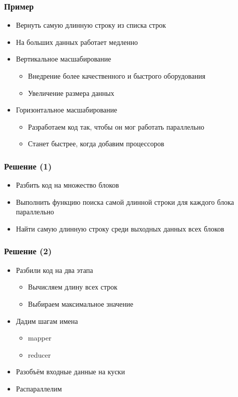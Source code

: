 \documentclass[xetex,mathserif,serif]{beamer}
\begin{document}
\begin{frame}

	\frametitle{Пример}

	\begin{itemize}
		\item Вернуть самую длинную строку из списка строк
		\item На больших данных работает медленно
		\item Вертикальное масшабирование
		      \begin{itemize}
			      \item Внедрение более качественного и быстрого оборудования
			      \item Увеличение размера данных
		      \end{itemize}
		\item Горизонтальное масшабирование
		      \begin{itemize}
			      \item Разработаем код так, чтобы он мог работать параллельно
			      \item Станет быстрее, когда добавим процессоров
		      \end{itemize}
	\end{itemize}

\end{frame}

\begin{frame}

	\frametitle{Решение (1)}

	\begin{itemize}
		\item Разбить код на множество блоков
		\item Выполнить функцию поиска самой длинной строки для каждого блока параллельно
		\item Найти самую длинную строку среди выходных данных всех блоков
	\end{itemize}

\end{frame}

\begin{frame}

	\frametitle{Решение (2)}

	\begin{itemize}
		\item Разбили код на два этапа
		      \begin{itemize}
			      \item Вычисляем длину всех строк
			      \item Выбираем максимальное значение
		      \end{itemize}
		\item Дадим шагам имена
		      \begin{itemize}
			      \item mapper
			      \item reducer
		      \end{itemize}
		\item Разобъём входные данные на куски
		\item Распараллелим
	\end{itemize}

\end{frame}
\end{document}
